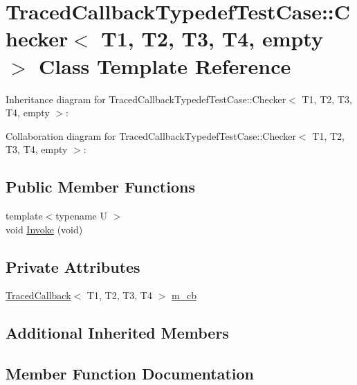 \hypertarget{classTracedCallbackTypedefTestCase_1_1Checker_3_01T1_00_01T2_00_01T3_00_01T4_00_01empty_01_4}{}\section{Traced\+Callback\+Typedef\+Test\+Case\+:\+:Checker$<$ T1, T2, T3, T4, empty $>$ Class Template Reference}
\label{classTracedCallbackTypedefTestCase_1_1Checker_3_01T1_00_01T2_00_01T3_00_01T4_00_01empty_01_4}


Inheritance diagram for Traced\+Callback\+Typedef\+Test\+Case\+:\+:Checker$<$ T1, T2, T3, T4, empty $>$\+:


Collaboration diagram for Traced\+Callback\+Typedef\+Test\+Case\+:\+:Checker$<$ T1, T2, T3, T4, empty $>$\+:
\subsection*{Public Member Functions}
\begin{DoxyCompactItemize}
\item 
{\footnotesize template$<$typename U $>$ }\\void \hyperlink{classTracedCallbackTypedefTestCase_1_1Checker_3_01T1_00_01T2_00_01T3_00_01T4_00_01empty_01_4_abaa74f06711d6a83eaa98bca033e776e}{Invoke} (void)
\end{DoxyCompactItemize}
\subsection*{Private Attributes}
\begin{DoxyCompactItemize}
\item 
\hyperlink{classns3_1_1TracedCallback}{Traced\+Callback}$<$ T1, T2, T3, T4 $>$ \hyperlink{classTracedCallbackTypedefTestCase_1_1Checker_3_01T1_00_01T2_00_01T3_00_01T4_00_01empty_01_4_ac39d786aff88e7c692fe94fd5c3718a0}{m\+\_\+cb}
\end{DoxyCompactItemize}
\subsection*{Additional Inherited Members}


\subsection{Member Function Documentation}
